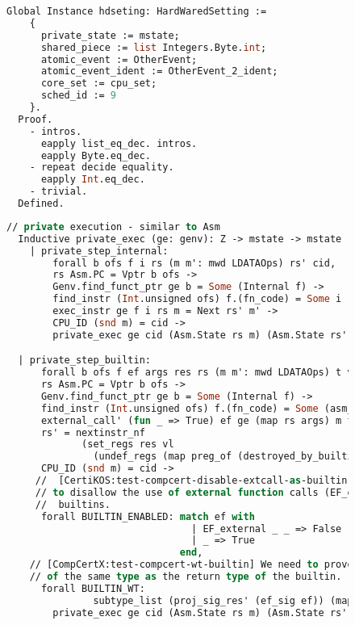 \begin{figure}
\begin{lstlisting}[language=Caml]
  Global Instance hdseting: HardWaredSetting :=
    {
      private_state := mstate;
      shared_piece := list Integers.Byte.int;
      atomic_event := OtherEvent;
      atomic_event_ident := OtherEvent_2_ident;
      core_set := cpu_set;
      sched_id := 9
    }.
  Proof.
    - intros.
      eapply list_eq_dec. intros.
      eapply Byte.eq_dec.
    - repeat decide equality.
      eapply Int.eq_dec.
    - trivial.
  Defined.
\end{lstlisting}
\end{figure}

\begin{figure}

\begin{lstlisting}[language=Caml]
  // private execution - similar to Asm
  Inductive private_exec (ge: genv): Z -> mstate -> mstate -> Prop :=
    | private_step_internal:
        forall b ofs f i rs (m m': mwd LDATAOps) rs' cid,
        rs Asm.PC = Vptr b ofs ->
        Genv.find_funct_ptr ge b = Some (Internal f) ->
        find_instr (Int.unsigned ofs) f.(fn_code) = Some i ->
        exec_instr ge f i rs m = Next rs' m' ->
        CPU_ID (snd m) = cid ->
        private_exec ge cid (Asm.State rs m) (Asm.State rs' m')

  | private_step_builtin:
      forall b ofs f ef args res rs (m m': mwd LDATAOps) t vl rs' cid,
      rs Asm.PC = Vptr b ofs ->
      Genv.find_funct_ptr ge b = Some (Internal f) ->
      find_instr (Int.unsigned ofs) f.(fn_code) = Some (asm_instruction (Pbuiltin ef args res)) ->
      external_call' (fun _ => True) ef ge (map rs args) m t vl m' ->
      rs' = nextinstr_nf 
             (set_regs res vl
               (undef_regs (map preg_of (destroyed_by_builtin ef)) rs)) ->
      CPU_ID (snd m) = cid ->
     //  [CertiKOS:test-compcert-disable-extcall-as-builtin] We need
     // to disallow the use of external function calls (EF_external) as
     //  builtins. 
      forall BUILTIN_ENABLED: match ef with
                                | EF_external _ _ => False
                                | _ => True
                              end,
    // [CompCertX:test-compcert-wt-builtin] We need to prove that registers updated by builtins are
    // of the same type as the return type of the builtin. 
      forall BUILTIN_WT: 
               subtype_list (proj_sig_res' (ef_sig ef)) (map typ_of_preg res) = true,
        private_exec ge cid (Asm.State rs m) (Asm.State rs' m')
\end{lstlisting}
\end{figure}

